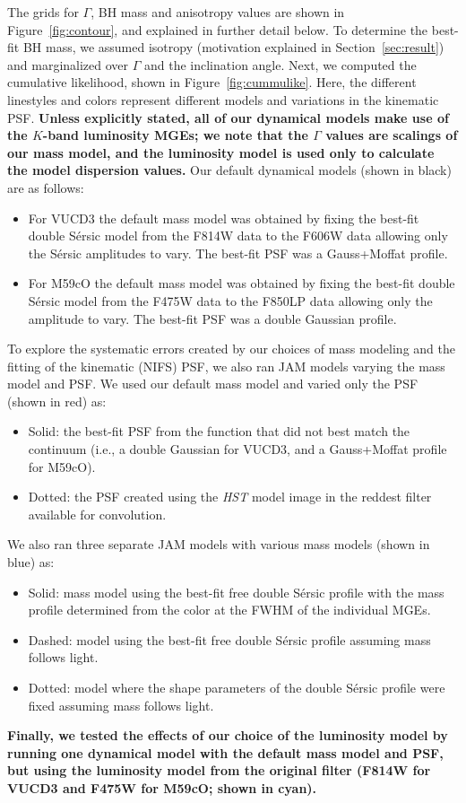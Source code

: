 \documentclass{aastex}
\begin{document}
The grids for $\Gamma$, BH mass and anisotropy values are shown in Figure~\ref{fig:contour}, and explained in further detail below. To determine the best-fit BH mass, we assumed isotropy (motivation explained in Section~\ref{sec:result}) and marginalized over $\Gamma$ and the inclination angle. Next, we computed the cumulative likelihood, shown in Figure~\ref{fig:cummulike}. Here, the different linestyles and colors represent different models and variations in the kinematic PSF. \textbf{Unless explicitly stated, all of our dynamical models make use of the $K$-band luminosity MGEs; we note that the $\Gamma$ values are scalings of our mass model, and the luminosity model is used only to calculate the model dispersion values.} Our default dynamical models (shown in black) are as follows:
\begin{itemize}
\item For VUCD3 the default mass model was obtained by fixing the best-fit double S\'ersic model from the F814W data to the F606W data allowing only the S\'ersic amplitudes to vary. The best-fit PSF was a Gauss+Moffat profile.
\item For M59cO the default mass model was obtained by fixing the best-fit double S\'ersic model from the F475W data to the F850LP data allowing only the amplitude to vary. The best-fit PSF was a double Gaussian profile.
\end{itemize}

To explore the systematic errors created by our choices of mass modeling and the fitting of the kinematic (NIFS) PSF, we also ran JAM models varying the mass model and PSF. We used our default mass model and varied only the PSF (shown in red) as: 
\begin{itemize}
\item Solid: the best-fit PSF from the function that did not best match the continuum (i.e., a double Gaussian for VUCD3, and a Gauss+Moffat profile for M59cO).
  \item Dotted: the PSF created using the \textit{HST} model image in the reddest filter available for convolution.  
\end{itemize}
We also ran three separate JAM models with various mass models (shown in blue) as:
\begin{itemize}
\item Solid: mass model using the best-fit free double S\'ersic profile with the mass profile determined from the color at the FWHM of the individual MGEs.
\item Dashed: model using the best-fit free double S\'ersic profile assuming mass follows light.
\item Dotted: model where the shape parameters of the double S\'ersic profile were fixed assuming mass follows light.
\end{itemize}
\textbf{Finally, we tested the effects of our choice of the luminosity model by running one dynamical model with the default mass model and PSF, but using the luminosity model from the original filter (F814W for VUCD3 and F475W for M59cO; shown in cyan).}
\end{document}
